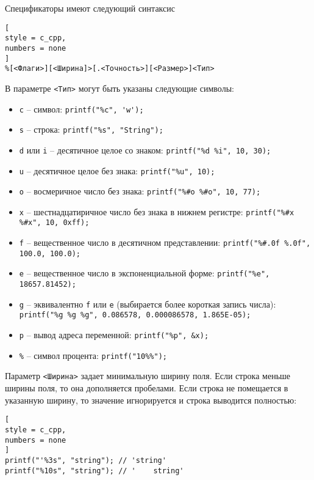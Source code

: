 \documentclass[%
	11pt,
	a4paper,
	utf8,
		]{article}
\begin{document}
Спецификаторы имеют следующий синтаксис \cite[]{prokhorenok-prog-c:2020}
\begin{lstlisting}[
style = c_cpp,
numbers = none
]
%[<Флаги>][<Ширина]>[.<Точность>][<Размер>]<Тип>
\end{lstlisting}

В параметре \verb|<Тип>| могут быть указаны следующие символы:
\begin{itemize}
	\item \verb*|c| -- символ: \verb|printf("%c", 'w');|
	
	\item \verb*|s| -- строка: \verb|printf("%s", "String");|
	
	\item \verb*|d| или \verb|i| -- десятичное целое со знаком: \verb|printf("%d %i", 10, 30);|
	
	\item \verb|u| -- десятичное целое без знака: \verb|printf("%u", 10);|
	
	\item \verb|o| -- восмеричное число без знака: \verb|printf("%#o %#o", 10, 77);|
	
	\item \verb|x| -- шестнадцатиричное число без знака в нижнем регистре: \verb|printf("%#x %#x", 10, 0xff);|
	
	\item \verb|f| -- вещественное число в десятичном представлении: \verb|printf("%#.0f %.0f", 100.0, 100.0);|
	
	\item \verb*|e| -- вещественное число в экспоненциальной форме: \verb|printf("%e", 18657.81452);|
	
	\item \verb|g| -- эквивалентно \verb*|f| или \verb|e| (выбирается более короткая запись числа):\\ \verb|printf("%g %g %g", 0.086578, 0.000086578, 1.865E-05);|
	
	\item \verb|p| -- вывод адреса переменной: \verb|printf("%p", &x);|
	
	\item \verb*|%| -- символ процента: \verb|printf("10%%");|
\end{itemize}

Параметр \verb|<Ширина>| задает минимальную ширину поля. Если строка меньше ширины поля, то она дополняется пробелами. Если строка не помещается в указанную ширину, то значение игнорируется и строка выводится полностью:
\begin{lstlisting}[
style = c_cpp,
numbers = none
]
printf("'%3s", "string"); // 'string'
printf("%10s", "string"); // '    string'
\end{lstlisting}
\end{document}
